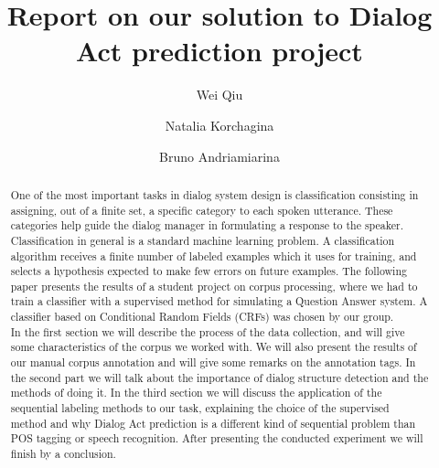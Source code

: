 \documentclass[a4paper]{article}
\title{Report on our solution to Dialog Act prediction project}
\author{Wei Qiu \and Natalia Korchagina \and Bruno Andriamiarina}
\date{}
\begin{document}
\maketitle
\begin{abstract}
One of the most important tasks in dialog system design is classification consisting in assigning, out of a finite set, a specific category to each spoken utterance. These categories help guide the dialog manager in formulating a response to the speaker. Classification in general is a standard machine learning problem. A classification algorithm receives a finite number of labeled examples which it uses for training, and selects a hypothesis expected to make few errors on future examples. The following paper presents the results of a student project on corpus processing, where we had to train a classifier with a supervised method for simulating a Question Answer system. A classifier based on Conditional Random Fields (CRFs) was chosen by our group. \\
In the first section we will describe the process of the data collection, and will give some characteristics of the corpus we worked with. We will also present the results of our manual corpus annotation and will give some remarks on the annotation tags. In the second part we will talk about the importance of dialog structure detection and the methods of doing it. In the third section we will discuss the application of the sequential labeling methods to our task, explaining the choice of the supervised method and why Dialog Act prediction is a different kind of sequential problem than POS tagging or speech recognition. After presenting the conducted experiment we will finish by a conclusion.\\
\end{abstract}
\end{document}
